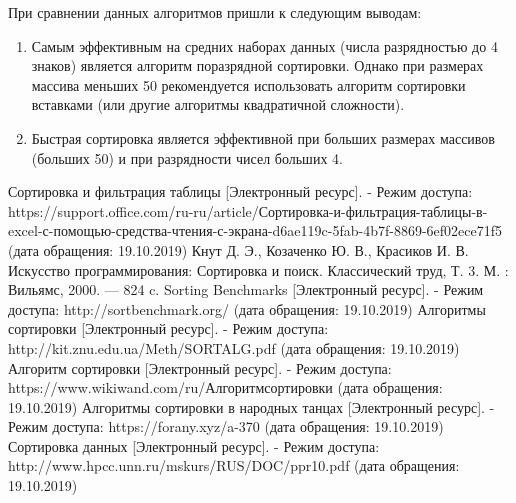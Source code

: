 \documentclass[a4paper,14pt]{article} %
\begin{document}
	При сравнении данных алгоритмов пришли к следующим выводам:
	\begin{enumerate}
 		\item Самым эффективным на средних наборах данных (числа разрядностью до 4 знаков) является алгоритм поразрядной сортировки. Однако при размерах массива меньших 50 рекомендуется использовать алгоритм сортировки вставками (или другие алгоритмы квадратичной сложности). 
		
 		\item Быстрая сортировка является эффективной при больших размерах массивов (больших 50) и при разрядности чисел больших 4. 
		
	\end{enumerate}
	
 	\newpage

        \begin{thebibliography}{}
        		\bibitem{} Сортировка и фильтрация таблицы [Электронный ресурс]. - Режим доступа: https://support.office.com/ru-ru/article/Сортировка-и-фильтрация-таблицы-в-excel-с-помощью-средства-чтения-с-экрана-d6ae119c-5fab-4b7f-8869-6ef02ece71f5 (дата обращения: 19.10.2019)
		\bibitem{} Кнут Д. Э., Козаченко Ю. В., Красиков И. В. Искусство программирования: Сортировка и поиск. Классический труд, Т. 3. М. : Вильямс, 2000. –– 824 c.
		\bibitem{}  Sorting Benchmarks [Электронный ресурс]. - Режим доступа: http://sortbenchmark.org/ (дата обращения: 19.10.2019)
		\bibitem{}  Алгоритмы сортировки [Электронный ресурс]. - Режим доступа: http://kit.znu.edu.ua/Meth/SORTALG.pdf (дата обращения: 19.10.2019)
		\bibitem{} Алгоритм сортировки [Электронный ресурс]. - Режим доступа: https://www.wikiwand.com/ru/Алгоритмсортировки (дата обращения: 19.10.2019)
		\bibitem{}  Алгоритмы сортировки в народных танцах [Электронный ресурс]. - Режим доступа: https://forany.xyz/a-370 (дата обращения: 19.10.2019)
		\bibitem{}  Сортировка данных [Электронный ресурс]. - Режим доступа: http://www.hpcc.unn.ru/mskurs/RUS/DOC/ppr10.pdf (дата обращения: 19.10.2019)
	\end{thebibliography} 
\end{document}
